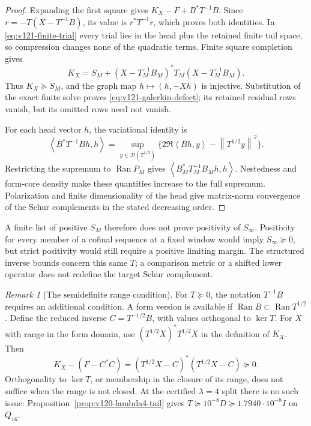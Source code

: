 \documentclass[11pt]{article}
\theoremstyle{remark}
\newtheorem{remark}[theorem]{Remark}
\newcommand{\norm}[1]{\left\lVert #1\right\rVert}
\newcommand{\ip}[2]{\left\langle #1,#2\right\rangle}
\begin{document}
\begin{proof}
Expanding the first square gives $K_X-F+B^*T^{-1}B$.
Since $r=-T(X-T^{-1}B)$, its value is $r^*T^{-1}r$,
which proves both identities. In \eqref{eq:v121-finite-trial}
every trial lies in the head plus the retained finite tail space,
so compression changes none of the quadratic terms. Finite square completion gives
\[
 K_X=S_M+(X-T_M^{-1}B_M)^*T_M(X-T_M^{-1}B_M).
\]
Thus $K_X\succeq S_M$, and the graph map $h\mapsto(h,-Xh)$ is
injective. Substitution of the exact finite solve proves
\eqref{eq:v121-galerkin-defect}; its retained residual rows vanish,
but its omitted rows need not vanish.

For each head vector $h$, the variational identity is
\[
 \ip{B^*T^{-1}Bh}{h}
 =\sup_{y\in\mathcal D(T^{1/2})}
 \{2\Re\ip{Bh}{y}-\norm{T^{1/2}y}^2\}.
\]
Restricting the supremum to $\operatorname{Ran}P_M$ gives
$\ip{B_M^*T_M^{-1}B_Mh}{h}$. Nestedness and form-core density make
these quantities increase to the full supremum. Polarization and
finite dimensionality of the head give matrix-norm convergence of
the Schur complements in the stated decreasing order.
\end{proof}

A finite list of positive $S_M$ therefore does not prove positivity
of $S_\infty$. Positivity for every member of a cofinal sequence at
a fixed window would imply $S_\infty\succeq0$, but strict positivity
would still require a positive limiting margin. The structured inverse
bounds concern this same $T$; a comparison metric or a shifted lower
operator does not redefine the target Schur complement.

\begin{remark}[The semidefinite range condition]\label{rem:v121-range}
For $T\succeq0$, the notation $T^{-1}B$ requires an additional
condition. A form version is available if
$\operatorname{Ran}B\subset\operatorname{Ran}T^{1/2}$. Define the
reduced inverse $C=T^{-1/2}B$, with values orthogonal to $\ker T$.
For $X$ with range in the form domain, use
$(T^{1/2}X)^*T^{1/2}X$ in the definition of $K_X$. Then
\[
 K_X-(F-C^*C)=(T^{1/2}X-C)^*(T^{1/2}X-C)\succeq0.
\]
Orthogonality to $\ker T$, or membership in the closure of its range,
does not suffice when the range is not closed. At the certified
$\lambda=4$ split there is no such issue:
Proposition~\ref{prop:v120-lambda4-tail} gives
$T\succeq10^{-8}D\succeq1.7940\cdot10^{-8}I$ on $Q_{16}$.
\end{remark}
\end{document}
